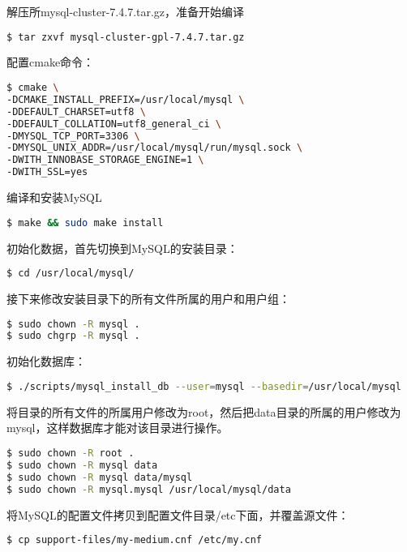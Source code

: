 解压所mysql-cluster-7.4.7.tar.gz，准备开始编译


\begin{lstlisting}[language=bash]
$ tar zxvf mysql-cluster-gpl-7.4.7.tar.gz
\end{lstlisting}

配置cmake命令：


\begin{lstlisting}[language=bash]
$ cmake \
-DCMAKE_INSTALL_PREFIX=/usr/local/mysql \
-DDEFAULT_CHARSET=utf8 \
-DDEFAULT_COLLATION=utf8_general_ci \
-DMYSQL_TCP_PORT=3306 \
-DMYSQL_UNIX_ADDR=/usr/local/mysql/run/mysql.sock \
-DWITH_INNOBASE_STORAGE_ENGINE=1 \
-DWITH_SSL=yes
\end{lstlisting}

编译和安装MySQL


\begin{lstlisting}[language=bash]
$ make && sudo make install
\end{lstlisting}

初始化数据，首先切换到MySQL的安装目录：


\begin{lstlisting}[language=bash]
$ cd /usr/local/mysql/
\end{lstlisting}


接下来修改安装目录下的所有文件所属的用户和用户组：

\begin{lstlisting}[language=bash]
$ sudo chown -R mysql .
$ sudo chgrp -R mysql .
\end{lstlisting}

初始化数据库：


\begin{lstlisting}[language=bash]
$ ./scripts/mysql_install_db --user=mysql --basedir=/usr/local/mysql
\end{lstlisting}

将目录的所有文件的所属用户修改为root，然后把data目录的所属的用户修改为mysql，这样数据库才能对该目录进行操作。


\begin{lstlisting}[language=bash]
$ sudo chown -R root .
$ sudo chown -R mysql data
$ sudo chown -R mysql data/mysql
$ sudo chown -R mysql.mysql /usr/local/mysql/data
\end{lstlisting}

将MySQL的配置文件拷贝到配置文件目录/etc下面，并覆盖源文件：


\begin{lstlisting}[language=bash]
$ cp support-files/my-medium.cnf /etc/my.cnf
\end{lstlisting}

